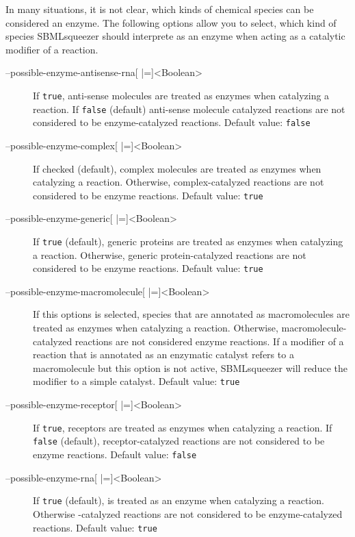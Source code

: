 In many situations, it is not clear, which kinds of chemical species can be
considered an enzyme. The following options allow you to select, which kind
of species SBMLsqueezer should interprete as an enzyme when acting as a
catalytic modifier of a reaction.
\begin{description}
\item[--possible-enzyme-antisense-rna{[} |={]}<Boolean>]
  If \texttt{true}, anti-sense \RNA molecules are treated as enzymes when
  catalyzing a reaction. If \texttt{false} (default) anti-sense \RNA molecule
  catalyzed reactions are not considered to be enzyme-catalyzed
  reactions.
  Default value: \texttt{false}

\item[--possible-enzyme-complex{[} |={]}<Boolean>]
  If checked (default), complex molecules are treated as enzymes
  when catalyzing a reaction. Otherwise, complex-catalyzed reactions
  are not considered to be enzyme reactions.
  Default value: \texttt{true}

\item[--possible-enzyme-generic{[} |={]}<Boolean>]
  If \texttt{true} (default), generic proteins are treated as enzymes when
  catalyzing a reaction. Otherwise, generic protein-catalyzed
  reactions are not considered to be enzyme reactions.
  Default value: \texttt{true}

\item[--possible-enzyme-macromolecule{[} |={]}<Boolean>]
  If this options is selected, species that are annotated as macromolecules
  are treated as enzymes when catalyzing a reaction. Otherwise,
  macromolecule-catalyzed reactions are not considered enzyme
  reactions. If a modifier of a reaction that is annotated as
  an enzymatic catalyst refers to a macromolecule but this option
  is not active, SBMLsqueezer will reduce the modifier to a simple
  catalyst.
  Default value: \texttt{true}

\item[--possible-enzyme-receptor{[} |={]}<Boolean>]
  If \texttt{true}, receptors are treated as enzymes when catalyzing a reaction.
  If \texttt{false} (default), receptor-catalyzed reactions are not considered
  to be enzyme reactions.
  Default value: \texttt{false}

\item[--possible-enzyme-rna{[} |={]}<Boolean>]
  If \texttt{true} (default), \RNA is treated as an enzyme when catalyzing
  a reaction. Otherwise \RNA-catalyzed reactions are not considered
  to be enzyme-catalyzed reactions.
  Default value: \texttt{true}


\end{description}
